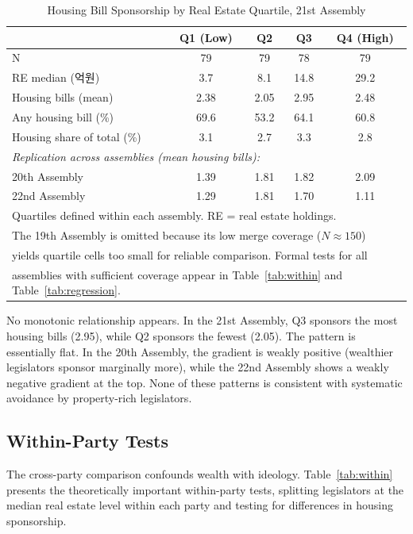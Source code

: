 \documentclass[11pt]{article}
\begin{document}
\begin{table}[htbp]
\centering
\caption{Housing Bill Sponsorship by Real Estate Quartile, 21st Assembly}
\label{tab:main}
\begin{tabular}{lcccc}
\toprule
& Q1 (Low) & Q2 & Q3 & Q4 (High) \\
\midrule
N & 79 & 79 & 78 & 79 \\
RE median (억원) & 3.7 & 8.1 & 14.8 & 29.2 \\
Housing bills (mean) & 2.38 & 2.05 & 2.95 & 2.48 \\
Any housing bill (\%) & 69.6 & 53.2 & 64.1 & 60.8 \\
Housing share of total (\%) & 3.1 & 2.7 & 3.3 & 2.8 \\
\midrule
\multicolumn{5}{l}{\textit{Replication across assemblies (mean housing bills):}} \\
\quad 20th Assembly & 1.39 & 1.81 & 1.82 & 2.09 \\
\quad 22nd Assembly & 1.29 & 1.81 & 1.70 & 1.11 \\
\bottomrule
\multicolumn{5}{l}{\footnotesize Quartiles defined within each assembly. RE = real estate holdings.} \\
\multicolumn{5}{l}{\footnotesize The 19th Assembly is omitted because its low merge coverage ($N \approx 150$)} \\
\multicolumn{5}{l}{\footnotesize yields quartile cells too small for reliable comparison. Formal tests for all} \\
\multicolumn{5}{l}{\footnotesize assemblies with sufficient coverage appear in Table~\ref{tab:within} and Table~\ref{tab:regression}.} \\
\end{tabular}
\end{table}

No monotonic relationship appears. In the 21st Assembly, Q3 sponsors the most housing bills (2.95), while Q2 sponsors the fewest (2.05). The pattern is essentially flat. In the 20th Assembly, the gradient is weakly positive (wealthier legislators sponsor marginally more), while the 22nd Assembly shows a weakly negative gradient at the top. None of these patterns is consistent with systematic avoidance by property-rich legislators.

\subsection{Within-Party Tests}

The cross-party comparison confounds wealth with ideology. Table~\ref{tab:within} presents the theoretically important within-party tests, splitting legislators at the median real estate level within each party and testing for differences in housing sponsorship.
\end{document}
